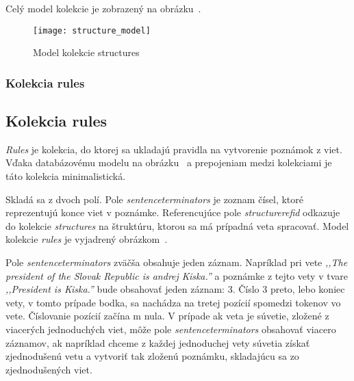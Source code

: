 Celý model kolekcie je zobrazený na obrázku~.

\begin{figure}[H]
	\begin{center}\texttt{[image: structure\_model]}\end{center}
	\caption[Model kolekcie structures]{Model kolekcie structures}\label{fig:structures_collection_model}
\end{figure}

%
%
{
	\subsubsection{Kolekcia rules}
}
{
	\subsection{Kolekcia rules}
}
\label{subsubsection:collection_rules}
\textit{Rules} je kolekcia, do ktorej sa ukladajú pravidla na vytvorenie poznámok z viet. Vďaka databázovému modelu na obrázku~ a prepojeniam medzi kolekciami je táto kolekcia minimalistická.

Skladá sa z dvoch polí. Pole \textit{sentence\textunderscore terminators} je zoznam čísel, ktoré reprezentujú konce viet v poznámke. Referencujúce pole \textit{structure\textunderscore ref\textunderscore id} odkazuje do kolekcie \textit{structures} na štruktúru, ktorou sa má prípadná veta spracovať. Model kolekcie \textit{rules} je vyjadrený obrázkom~.

Pole \textit{sentence\textunderscore terminators} zväčša obsahuje jeden záznam. Napríklad pri vete \textit{,,The president of the Slovak Republic is andrej Kiska.''} a poznámke z tejto vety v tvare \textit{,,President is Kiska.''} bude obsahovať jeden záznam: 3. Číslo 3 preto, lebo koniec vety, v tomto prípade bodka, sa nachádza na tretej pozícií spomedzi tokenov vo vete. Číslovanie pozícií začína  m nula. V prípade ak veta je súvetie, zložené z viacerých jednoduchých viet, môže pole \textit{sentence\textunderscore terminators} obsahovať viacero záznamov, ak napríklad chceme z každej jednoduchej vety súvetia získať zjednodušenú vetu a vytvoriť tak zloženú poznámku, skladajúcu sa zo zjednodušených viet.

